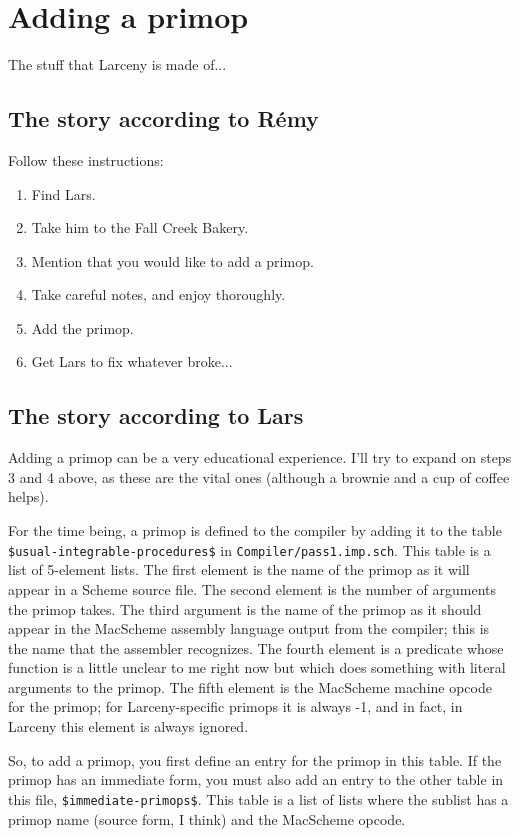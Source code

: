 \section{Adding a primop}

The stuff that Larceny is made of...

\subsection{The story according to R\'{e}my}

Follow these instructions:
\begin{enumerate}
\item Find Lars.
\item Take him to the Fall Creek Bakery.
\item Mention that you would like to add a primop.
\item Take careful notes, and enjoy thoroughly.
\item Add the primop.
\item Get Lars to fix whatever broke...
\end{enumerate}

\subsection{The story according to Lars}

Adding a primop can be a very educational experience. I'll try to expand on
steps 3 and 4 above, as these are the vital ones (although a brownie and a
cup of coffee helps).

For the time being, a primop is defined to the compiler by adding it to the
table \verb+$usual-integrable-procedures$+ in {\tt Compiler/pass1.imp.sch}.
This table is a list of 5-element lists. The first element is the name of
the primop as it will appear in a Scheme source file.  The second element is
the number of arguments the primop takes. The third argument is the name of
the primop as it should appear in the MacScheme assembly language output
from the compiler; this is the name that the assembler recognizes. The
fourth element is a predicate whose function is a little unclear to me right
now but which does something with literal arguments to the primop. The fifth
element is the MacScheme machine opcode for the primop; for Larceny-specific
primops it is always -1, and in fact, in Larceny this element is always
ignored.

So, to add a primop, you first define an entry for the primop in this table.
If the primop has an immediate form, you must also add an entry to the
other table in this file, \verb+$immediate-primops$+. This table is a list
of lists where the sublist has a primop name (source form, I think) and the
MacScheme opcode.

